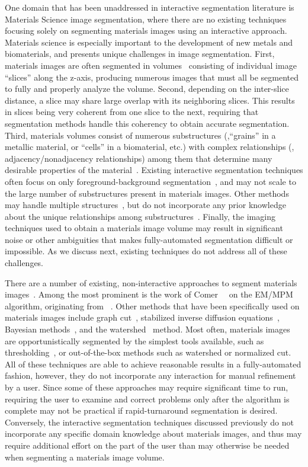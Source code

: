 \documentclass[]{spie}  %
\begin{document}
One domain that has been unaddressed in interactive segmentation
literature is Materials Science image segmentation, where there are no
existing techniques focusing solely on segmenting materials images
using an interactive approach.  Materials science is especially
important to the development of new metals and biomaterials, and
presents unique challenges in image segmentation.  First, materials
images are often segmented in volumes~\cite{ibrahim:91} consisting of
individual image ``slices'' along the z-axis, producing numerous
images that must all be segmented to fully and properly analyze the
volume.  Second, depending on the inter-slice distance, a slice may
share large overlap with its neighboring slices.  This results in
slices being very coherent from one slice to the next, requiring that
segmentation methods handle this coherency to obtain accurate
segmentation.  Third, materials volumes consist of numerous
substructures (\eg,``grains'' in a metallic material, or ``cells'' in
a biomaterial, etc.) with complex relationships (\eg,
adjacency/nonadjacency relationships) among them that determine many
desirable properties of the material~\cite{swiler:95, rollett:04}.
Existing interactive segmentation techniques often focus on only
foreground-background segmentation~\cite{rother:04, boykov:01b}, and
may not scale to the large number of substructures present in
materials images.  Other methods may handle multiple
structures~\cite{straehle:11, straehle:12}, but do not incorporate any
prior knowledge about the unique relationships among
substructures~\cite{reed:06, tan:04}.  Finally, the imaging techniques
used to obtain a materials image volume may result in significant
noise or other ambiguities that makes fully-automated segmentation
difficult or impossible.  As we discuss next, existing techniques do
not address all of these challenges.

There are a number of existing, non-interactive approaches to segment
materials images~\cite{chuang:08, simmons:09}.  Among the most
prominent is the work of Comer~\etal~\cite{comer:94, comer:00} on the
EM/MPM algorithm, originating from~\cite{marroquin:87} .  Other
methods that have been specifically used on materials images include
graph cut~\cite{landis:11, waggoner:11}, stabilized inverse diffusion
equations~\cite{huffman:08}, Bayesian methods~\cite{comer:11,
  simmons:08}, and the watershed~\cite{liq:07} method.  Most often,
materials images are opportunistically segmented by the simplest tools
available, such as thresholding~\cite{gonzalez:08,shapiro:01}, or
out-of-the-box methods such as watershed or normalized cut.  All of
these techniques are able to achieve reasonable results in a
fully-automated fashion, however, they do not incorporate any
interaction for manual refinement by a user.  Since some of these
approaches may require significant time to run, requiring the user to
examine and correct problems only after the algorithm is complete may
not be practical if rapid-turnaround segmentation is desired.
Conversely, the interactive segmentation techniques discussed
previously do not incorporate any specific domain knowledge about
materials images, and thus may require additional effort on the part
of the user than may otherwise be needed when segmenting a materials
image volume.
\end{document}
